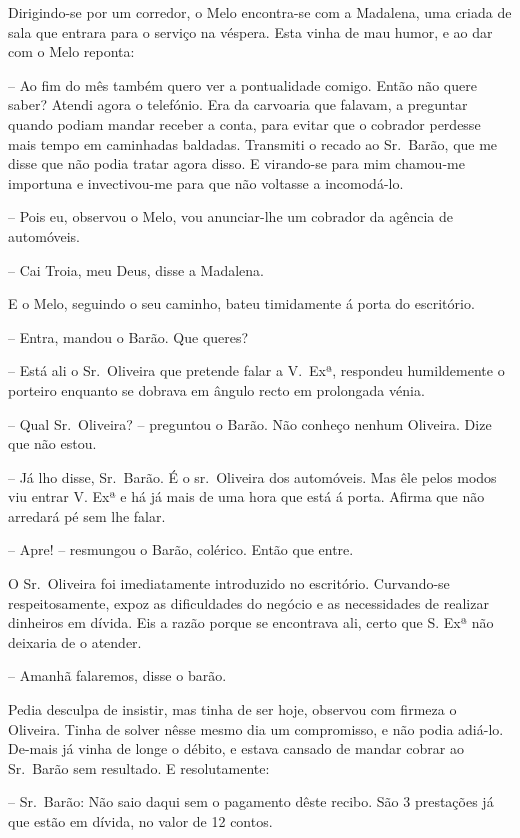 \documentclass[9pt]{article}
\begin{document}
Dirigindo-se por um corredor, o Melo encontra-se com a Madalena, uma
criada de sala que entrara para o serviço na véspera. Esta vinha de mau humor, e ao dar com o Melo reponta:

-- Ao fim do mês também quero ver a pontualidade comigo. Então não quere saber? Atendi agora o telefónio. Era da carvoaria que falavam, a preguntar quan\-do podiam mandar receber a conta, para evitar que o cobrador perdesse mais tempo em caminhadas baldadas. Transmiti o recado ao Sr.\ Barão, que
me disse que não podia tratar agora disso. E virando-se para mim chamou-me
importuna e invectivou-me para que não voltasse a incomodá-lo.

-- Pois eu, observou o Melo, vou anunciar-\-lhe um cobrador da agên\-cia de
automóveis.

-- Cai Troia, meu Deus, disse a Madalena.

E o Melo, seguindo o seu caminho, bateu timidamente á porta do escritório.

-- Entra, mandou o Barão. Que queres?

-- Está ali o Sr.\ Oliveira que pretende falar a V.\ Exª, respondeu humildemente o porteiro enquanto se dobrava em ângulo recto em prolongada vénia.

-- Qual Sr.\ Oliveira? -- preguntou o Barão. Não conheço nenhum Oliveira.
Dize que não estou.

-- Já lho disse, Sr.\ Barão. É o sr.\ Oliveira dos automóveis. Mas êle
pelos modos viu entrar V. Exª e há já mais de uma hora que está á porta.
Afirma que não arredará pé sem lhe falar.

-- Apre! -- resmungou o Barão, colérico. Então que entre.

O Sr.\ Oliveira foi imediatamente introduzido no escritório. Curvan\-do-se respeitosamente, expoz as dificuldades do negócio e as necessidades de
realizar dinheiros em dívida. Eis a razão porque se encontrava ali, certo
que S. Exª não deixaria de o atender.

-- Amanhã falaremos, disse o barão.

Pedia desculpa de insistir, mas tinha de ser hoje, observou com firmeza
o Oliveira. Tinha de solver nêsse mesmo dia um compromisso, e não podia
adiá-lo. De-mais já vinha de longe o débito, e estava cansado de mandar cobrar ao Sr.\ Barão sem resultado. E resolutamente:

-- Sr.\ Barão: Não saio daqui sem o pagamento dêste recibo. São 3 presta\-ções já que estão em dívida, no valor de 12 contos.
\end{document}
